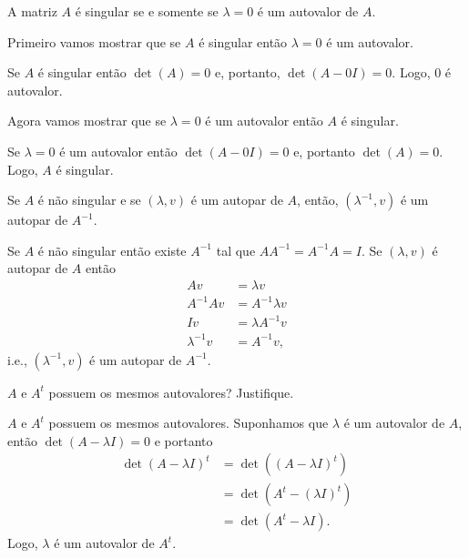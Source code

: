 \begin{questions}
    \question A matriz $A$ \'{e} singular se e somente se $\lambda = 0$ \'{e} um autovalor de $A$.
    \begin{solution}
        Primeiro vamos mostrar que se $A$ \'{e} singular ent\~{a}o $\lambda = 0$ \'{e} um autovalor.

        Se $A$ \'{e} singular ent\~{a}o $\det(A)=0$ e, portanto, $\det(A - 0I) = 0$. Logo, $0$ \'{e} autovalor.

        Agora vamos mostrar que se $\lambda = 0$ \'{e} um autovalor ent\~{a}o $A$ \'{e} singular.

        Se $\lambda = 0$ \'{e} um autovalor ent\~{a}o $\det(A - 0I) = 0$ e, portanto $\det(A) = 0$. Logo, $A$ \'{e} singular.
    \end{solution}

    \question Se $A$ \'{e} n\~{a}o singular e se $(\lambda, v)$ \'{e} um autopar de $A$, ent\~{a}o, $(\lambda^{-1}, v)$ \'{e} um autopar de $A^{-1}$.
    \begin{solution}
        Se $A$ \'{e} n\~{a}o singular ent\~{a}o existe $A^{-1}$ tal que $A A^{-1} = A^{-1} A = I$. Se $(\lambda, v)$ \'{e} autopar de $A$ ent\~{a}o
        \begin{align*}
            A v &= \lambda v \\
            A^{-1} A v &= A^{-1} \lambda v \\
            I v &= \lambda A^{-1} v \\
            \lambda^{-1} v &= A^{-1} v,
        \end{align*}
        i.e., $(\lambda^{-1}, v)$ \'{e} um autopar de $A^{-1}$.
    \end{solution}

    \question $A$ e $A^t$ possuem os mesmos autovalores? Justifique.
    \begin{solution}
        $A$ e $A^t$ possuem os mesmos autovalores. Suponhamos que $\lambda$ \'{e} um autovalor de $A$, ent\~{a}o $\det(A - \lambda I) = 0$ e portanto
        \begin{align*}
            \det(A - \lambda I)^t &= \det\left( (A - \lambda I)^t \right) \\
            &= \det(A^t - (\lambda I)^t) \\
            &= \det(A^t - \lambda I).
        \end{align*}
        Logo, $\lambda$ \'{e} um autovalor de $A^t$.
    \end{solution}


\end{questions}
